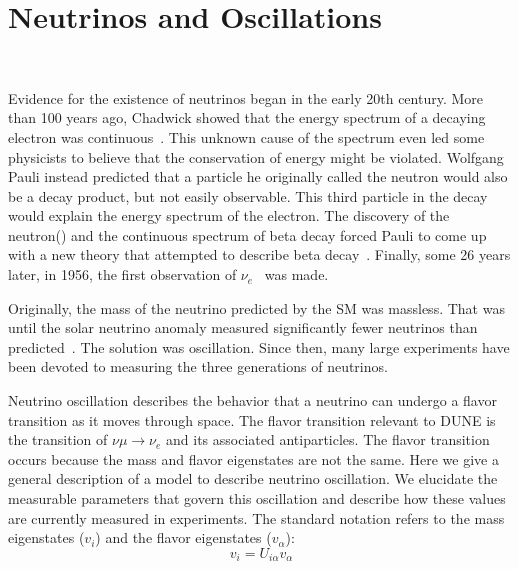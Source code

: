 \section{Neutrinos and Oscillations}~\label{sec:neutrino_oscillation}

Evidence for the existence of neutrinos began in the early 20th century.
More than 100 years ago, Chadwick showed that the energy spectrum of a decaying electron was continuous~\citep{Chadwick:1914zz}.
This unknown cause of the spectrum even led some physicists to believe that the conservation of energy might be violated.
Wolfgang Pauli instead predicted that a particle he originally called the neutron would also be a decay product, but not easily observable.
This third particle in the decay would explain the energy spectrum of the electron.
The discovery of the neutron(\citep{Chadwick1932PossibleEO}) and the continuous spectrum of beta decay forced Pauli to come up with a new theory that attempted to describe beta decay~\citep{pauli_1934}.
Finally, some 26 years later, in 1956, the first observation of $\nu_{e}$~\citep{first_neutrino_measurement} was made.

Originally, the mass of the neutrino predicted by the SM was massless.
That was until the solar neutrino anomaly measured significantly fewer neutrinos than predicted~\citep{solar_neutrino_problem_PhysRevLett.20.1205}.
The solution was oscillation.
Since then, many large experiments have been devoted to measuring the three generations of neutrinos.
~\citep{SNO_2002_neutrino_PhysRevLett.89.011301,
neutrino_measurement_NOvA_2019_prl,
t2k_2011_neutrino_PhysRevLett.107.041801,
reno_2012_neutrino_PhysRevLett.108.191802,
FUKUDA2002_solar_neutrino_oscillation,
kamland_2003_neutrino_PhysRevLett.90.021802,
daya_bay_2012_neutrino_PhysRevLett.108.171803,
PhysRevD.91.072010_t2k_2015,
doubleChooz_2012_neutrino_PhysRevLett.108.131801}

Neutrino oscillation describes the behavior that a neutrino can undergo a flavor transition as it moves through space.
The flavor transition relevant to DUNE is the transition of $\nu{\mu}\rightarrow \nu_{e}$ and its associated antiparticles. 
The flavor transition occurs because the mass and flavor eigenstates are not the same.
Here we give a general description of a model to describe neutrino oscillation.
We elucidate the measurable parameters that govern this oscillation and describe how these values are currently measured in experiments.
The standard notation refers to the mass eigenstates ($v_{i}$) and the flavor eigenstates ($v_{\alpha}$):
\begin{equation}~\label{eq:relate_eigenstates}
  v_{i} = U_{i\alpha}v_{\alpha}
\end{equation}


